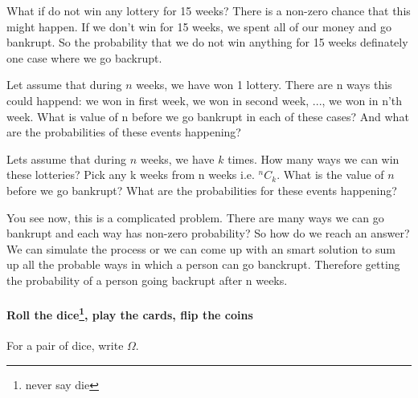 \documentclass[a4paper,9pt, addpoints, solutions]{exam}
\begin{document}
\begin{questions}
\begin{solution}
What if do not win any lottery for 15 weeks? There is a non-zero chance that
this might happen. If we don't win for 15 weeks, we spent all of our money and
go bankrupt. So the probability that we do not win anything for 15 weeks
definately one case where we go backrupt. 

Let assume that during $n$ weeks, we have won 1 lottery. There are n ways this
could happend: we won in first week, we won in second week, ..., we won in n'th
week. What is value of n before we go bankrupt in each of these cases? And what
are the probabilities of these events happening?

Lets assume that during $n$ weeks, we have $k$ times. How many ways we can win
these lotteries? Pick any k weeks from n weeks i.e. $^nC_k$. What is the value
of $n$ before we go bankrupt? What are the probabilities for these events
happening?

You see now, this is a complicated problem. There are many ways we can go
bankrupt and each way has non-zero probability? So how do we reach an answer? We
can simulate the process or we can come up with an smart solution to sum up all
the probable ways in which a person can go banckrupt. Therefore getting the
probability of a person going backrupt after n weeks.

\end{solution}

\paragraph{Roll the dice\footnote{never say die}, play the cards, flip the coins}

\question For a pair of dice, write $\Omega$.
\end{questions}
\end{document}
